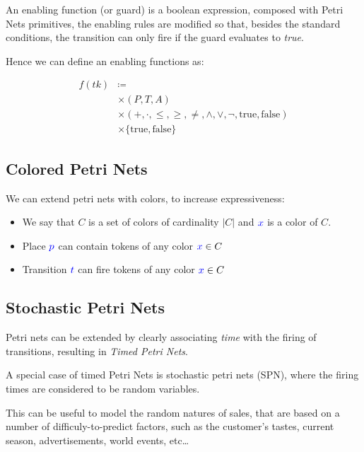 \documentclass[openright, twoside, twocolumn]{report}
\begin{document}
    An enabling function (or guard) is a boolean expression, composed with Petri Nets primitives, the enabling rules
    are modified so that, besides the standard conditions, the transition can only fire if the guard evaluates to
    \emph{true}.

    Hence we can define an enabling functions as:

\begin{align*}
  f(tk) &\coloneqq \\
  &\times (P, T, A)\\
  &\times  (+, \cdot, \leq, \geq, \neq, \land, \lor, \neg, \text{true}, \text{false})\\
  &\times  \{ \text{true}, \text{false} \}
\end{align*}

  \subsection{Colored Petri Nets}

  We can extend petri nets with colors, to increase expressiveness:

  \begin{itemize}
    \item We say that $C$ is a set of colors of cardinality $|C|$ and $\textcolor{blue}{x}$ is a color of $C$.
    \item Place $\textcolor{blue}{p}$ can contain tokens of any color $\textcolor{blue}{x} \in  C $
    \item Transition $\textcolor{blue}{t}$ can fire tokens of any color $\textcolor{blue}{x} \in C$
  \end{itemize}

  \subsection{Stochastic Petri Nets}

  Petri nets can be extended by clearly associating \emph{time} with the firing of transitions,
  resulting in \emph{Timed Petri Nets}.

  A special case of timed Petri Nets is stochastic petri nets (SPN), where the firing times are
  considered to be random variables.

  This can be useful to model the random natures of sales, that are based on a number of
  difficuly-to-predict factors, such as the customer's tastes, current season, advertisements,
  world events, etc\dots
\end{document}
